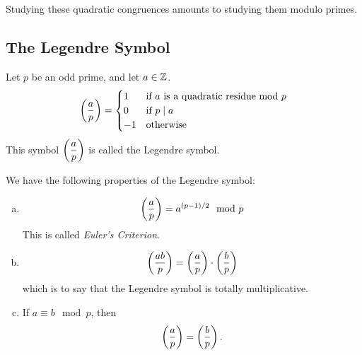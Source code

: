\begin{remark*}
    Studying these quadratic congruences amounts to studying them modulo primes.
\end{remark*}

\subsection{The Legendre Symbol}
\begin{definition}\label{defn:legendre-symbol}
    Let $p$ be an odd prime, and let $a\in\mathbb Z$.
    \[\left(\dfrac{a}{p}\right) = \begin{cases}
            1  & \text{if $a$ is a quadratic residue mod $p$} \\
            0  & \text{if $p\mid a$}                          \\
            -1 & \text{otherwise}
        \end{cases}\]
    This symbol $\left(\dfrac{a}{p}\right)$ is called the Legendre symbol.
\end{definition}

\begin{proposition}[5.1.2 of Text]\label{prop:5.1.2}
    We have the following properties of the Legendre symbol:
    \begin{enumerate}[(a)]
        \item
              \[\left(\dfrac{a}{p}\right) = a^{(p-1)/2}\mod p\]
              This is called \emph{Euler's Criterion}.
        \item
              \[\left(\dfrac{ab}{p}\right) = \left(\dfrac{a}{p}\right)\cdot\left(\dfrac{b}{p}\right)\]
              which is to say that the Legendre symbol is totally multiplicative.
        \item If $a\equiv b\mod p$, then
              \[\left(\dfrac{a}{p}\right) = \left(\dfrac{b}{p}\right).\]
    \end{enumerate}
\end{proposition}